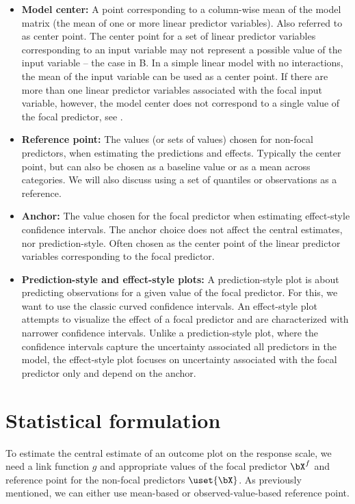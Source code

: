 \begin{itemize}
\item \textbf{Model center:} A point corresponding to a column-wise mean of the model matrix (the mean of one or more linear predictor variables). Also referred to as center point. The center point for a set of linear predictor variables corresponding to an input variable may not represent a possible value of the input variable -- the case in B. In a simple linear model with no interactions, the mean of the input variable can be used as a center point. If there are more than one linear predictor variables associated with the focal input variable, however, the model center does not correspond to a single value of the focal predictor, see .


\item \textbf{Reference point:} The values (or sets of values) chosen for non-focal predictors, when estimating the predictions and effects. Typically the center point, but can also be chosen as a baseline value or as a mean across categories. We will also discuss using a set of quantiles or observations as a reference.

\item \textbf{Anchor:} The value chosen for the focal predictor when estimating effect-style confidence intervals. The anchor choice does not affect the central estimates, nor prediction-style. Often chosen as the center point of the linear predictor variables corresponding to the focal predictor. 

\item \textbf{Prediction-style and effect-style plots:} A prediction-style plot is about predicting observations for a given value of the focal predictor. For this, we want to use the classic curved confidence intervals. An effect-style plot attempts to visualize the effect of a focal predictor and are characterized with narrower confidence intervals. Unlike a prediction-style plot, where the confidence intervals capture the uncertainty associated all predictors in the model, the effect-style plot focuses on uncertainty associated with the focal predictor only and depend on the anchor.

\end{itemize}

\section{Statistical formulation}

To estimate the central estimate of an outcome plot on the response scale, we need a link function $g$ and appropriate values of the focal predictor $\bX^{f}$ and reference point for the non-focal predictors $\uset{{\bX}}$. As previously mentioned, we can either use mean-based or observed-value-based reference point. 

